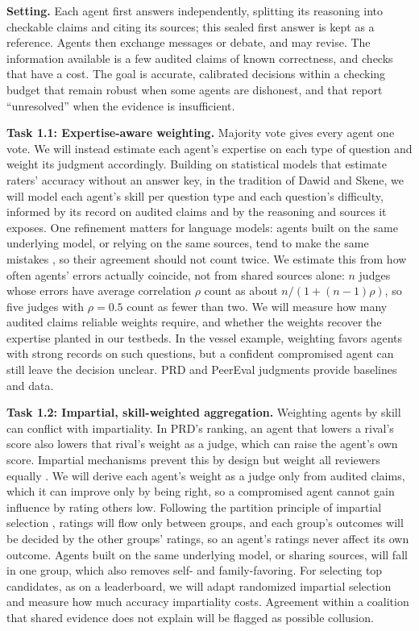 \documentclass[11pt,letterpaper]{article}
\newcommand{\rg}[1]{\par\smallskip{\normalfont\bfseries\itshape #1}\par}
\newcommand{\task}[1]{\textbf{#1}\hspace{0.4em}}
\begin{document}
\textbf{Setting.} Each agent first answers independently, splitting its reasoning into checkable claims and citing its sources; this sealed first answer is kept as a reference. Agents then exchange messages or debate, and may revise. The information available is a few audited claims of known correctness, and checks that have a cost. The goal is accurate, calibrated decisions within a checking budget that remain robust when some agents are dishonest, and that report ``unresolved'' when the evidence is insufficient.

\rg{RG1. Learn whom to trust}
\task{Task 1.1: Expertise-aware weighting.} Majority vote gives every agent one vote. We will instead estimate each agent's expertise on each type of question and weight its judgment accordingly. Building on statistical models that estimate raters' accuracy without an answer key, in the tradition of Dawid and Skene, we will model each agent's skill per question type and each question's difficulty, informed by its record on audited claims and by the reasoning and sources it exposes. One refinement matters for language models: agents built on the same underlying model, or relying on the same sources, tend to make the same mistakes \cite{kim2025correlated}, so their agreement should not count twice. We estimate this from how often agents' errors actually coincide, not from shared sources alone: $n$ judges whose errors have average correlation $\rho$ count as about $n/(1+(n-1)\rho)$, so five judges with $\rho = 0.5$ count as fewer than two. We will measure how many audited claims reliable weights require, and whether the weights recover the expertise planted in our testbeds. In the vessel example, weighting favors agents with strong records on such questions, but a confident compromised agent can still leave the decision unclear. PRD and PeerEval judgments provide baselines and data.

\task{Task 1.2: Impartial, skill-weighted aggregation.} Weighting agents by skill can conflict with impartiality. In PRD's ranking, an agent that lowers a rival's score also lowers that rival's weight as a judge, which can raise the agent's own score. Impartial mechanisms prevent this by design but weight all reviewers equally \cite{kurokawa2015impartial}. We will derive each agent's weight as a judge only from audited claims, which it can improve only by being right, so a compromised agent cannot gain influence by rating others low. Following the partition principle of impartial selection \cite{alon2011sum}, ratings will flow only between groups, and each group's outcomes will be decided by the other groups' ratings, so an agent's ratings never affect its own outcome. Agents built on the same underlying model, or sharing sources, will fall in one group, which also removes self- and family-favoring. For selecting top candidates, as on a leaderboard, we will adapt randomized impartial selection \cite{kurokawa2015impartial} and measure how much accuracy impartiality costs. Agreement within a coalition that shared evidence does not explain will be flagged as possible collusion.
\end{document}
